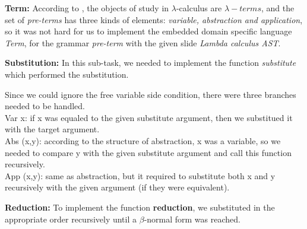 \documentclass{article}
\begin{document}
\textbf{Term:} According to \cite{sorensen2006lectures}, the objects of study in $\lambda$-calculus are $\lambda-terms$, and the set of \emph{pre-terms} has three kinds of elements: \emph{variable, abstraction and application}, so it was not hard for us to implement the embedded domain specific language \emph{Term}, for the grammar \emph{pre-term} with the given slide \emph{Lambda calculus AST}.


\textbf{Substitution:} In this sub-task, we needed to implement the function \emph{substitute} which performed the substitution.

Since we could ignore the free variable side condition, there were three branches needed to be handled.\\
\indent Var x: if x was equaled to the given substitute argument, then we substitued it with the target argument.\\
\indent Abs (x,y): according to the structure of abstraction, x was a variable, so we needed to compare y with the given substitute argument and call this function recursively.\\
\indent App (x,y): same as abstraction, but it required to substitute both x and y recursively with the given argument (if they were equivalent).



\textbf{Reduction:} To implement the function \textbf{reduction}, we substituted in the appropriate order recursively until a $\beta$-normal form was reached. 
\end{document}
